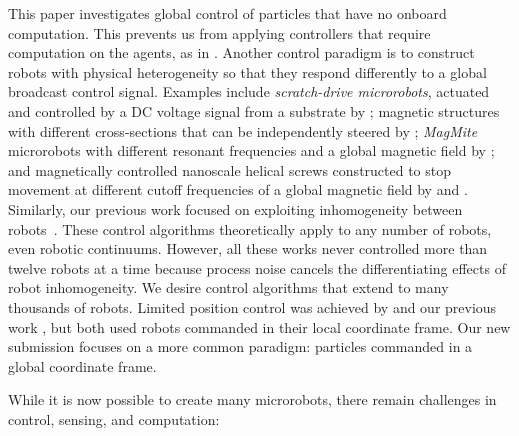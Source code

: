This paper investigates global control of particles that have no onboard computation. This prevents us from applying controllers that require computation on the agents, as in \cite{milutinovic2006modeling,prorok2011multi,demir2015probabilistic}.
Another control paradigm is to construct robots with physical heterogeneity so that they respond differently to a global broadcast control signal.  Examples include \emph{scratch-drive microrobots}, actuated and controlled by a DC voltage signal from a substrate by \cite{Donald2006,Donald2008};  magnetic structures  with different cross-sections that can be independently steered by \cite{Floyd2011,Diller2013};  \emph{MagMite} microrobots with different resonant frequencies and a global magnetic field by \cite{Frutiger2008}; and  magnetically controlled nanoscale helical screws constructed to stop movement at different cutoff frequencies of a global magnetic field by
\cite{Tottori2012} and \cite{Peyer2013}. 
Similarly, our previous work focused on exploiting inhomogeneity between robots~\cite{Becker2012,Becker2012k}.  These control algorithms theoretically apply to any number of robots, even robotic continuums.
However, all these works never controlled more than twelve robots at a time because process noise cancels the differentiating effects of robot inhomogeneity.
 We desire control algorithms that extend to many thousands of robots.
Limited position control was achieved by \cite{bretl2007control} and our previous work \cite{beckerIJRR2014}, but both used robots commanded in their local coordinate frame. Our new submission focuses on a more common paradigm: particles commanded in a global coordinate frame.

 While it is now possible to create many microrobots, there remain challenges in control, sensing, and computation:
  
